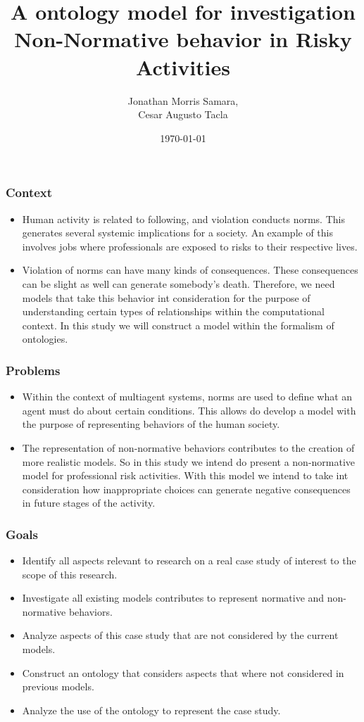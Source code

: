 \documentclass{beamer}
\title[Non-normative Agent Modeling]{A ontology model for investigation Non-Normative behavior in Risky Activities}
\author{Jonathan Morris Samara,\\ Cesar Augusto Tacla} %
\institute[UCLA] %
{
Universidade Tecnológica Federal do Paraná \\ %
\medskip
\textit{jonathan\_samara@hotmail.com \\ cesar.tacla@gmail.com} %
}
\date{\today} %
\begin{document}
\begin{frame}
	\titlepage
\end{frame}
\begin{frame}
	\frametitle{Context}
		  \begin{itemize}
				\item Human activity is related to following, and violation conducts norms. This generates several systemic implications for a society. An example of this involves jobs where professionals are exposed to risks to their respective lives.	  
				\item Violation of norms can have many kinds of consequences. These consequences can be slight as well can generate somebody's death. Therefore, we need models that take this behavior int consideration for the purpose of understanding certain types of relationships within the computational context. In this study we will construct a model within the formalism of ontologies.
		\end{itemize}
\end{frame}
\begin{frame}
	\frametitle{Problems}
		\begin{itemize}
			\item Within the context of multiagent systems, norms are used to define what an agent must do about certain conditions. This allows do develop a model with the purpose of representing behaviors of the human society.
			\item The representation of non-normative behaviors contributes to the creation of more realistic models. So in this study we intend do present a non-normative model for professional risk activities. With this model we intend to take int consideration how inappropriate choices can generate negative consequences in future stages of the activity.

	\end{itemize}
\end{frame}
\begin{frame}
	\frametitle{Goals}
	\begin{itemize}
		\item Identify all aspects relevant to research on a real case study of interest to the scope of this research.
		\item Investigate all existing models contributes to represent normative and non-normative behaviors.
		\item Analyze aspects of this case study that are not considered by the current models.
		\item Construct an ontology that considers aspects that where not considered in previous models.
		\item Analyze the use of the ontology to represent the case study.
	\end{itemize}
\end{frame}
\end{document}
